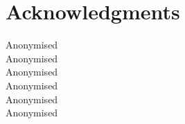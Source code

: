 \documentclass[11pt]{article}
\begin{document}
\section*{Acknowledgments}

Anonymised\\
Anonymised\\
Anonymised\\
Anonymised\\
Anonymised\\
Anonymised\\




\end{document}
